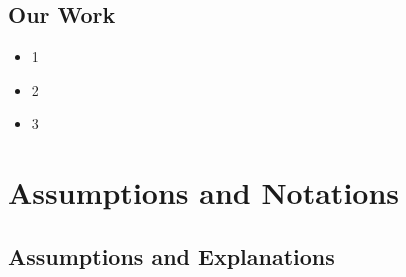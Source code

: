 \documentclass{HZNUMCM}
\begin{document}
    \subsection{Our Work}
    \begin{itemize}
      \item 1
      \item 2
      \item 3
    \end{itemize}

  \section{Assumptions and Notations}
    \subsection{Assumptions and Explanations}
\end{document}
